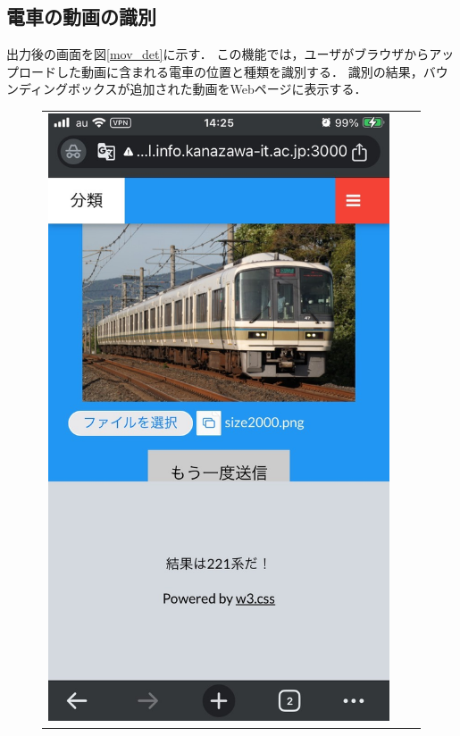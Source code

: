 \begin{multicols*}{2}
\subsection{電車の動画の識別} 
出力後の画面を図\ref{mov_det}に示す．
この機能では，ユーザがブラウザからアップロードした動画に含まれる電車の位置と種類を識別する． 識別の結果，バウンディングボックスが追加された動画をWebページに表示する．


\begin{figure}
	\begin{tabular}{ccc}
		\begin{minipage}[b]{0.3\textwidth}
			\centering
			\includegraphics[width=\linewidth]{obj/img_classify.jpg}

\end{minipage}
\end{tabular}
\end{figure}
\end{multicols*}
